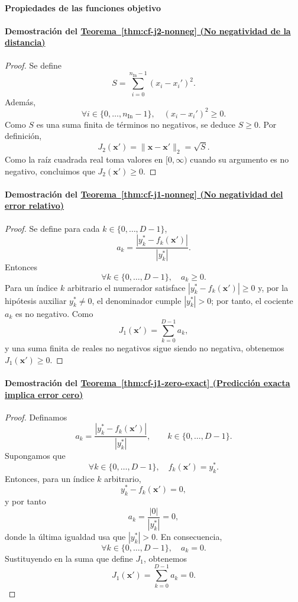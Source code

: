 \documentclass[12pt]{report} %
\begin{document}
\paragraph*{Propiedades de las funciones objetivo}

\paragraph*{Demostración del \hyperref[thm:cf-j2-nonneg]{Teorema~\ref*{thm:cf-j2-nonneg} (No negatividad de la distancia)}}
\begin{proof}
    Se define
    $$S = \sum_{i=0}^{n_{\text{In}}-1}(x_i - x_i')^2.$$
    Además,
    $$\forall i \in \{0, \ldots, n_{\text{In}}-1\},\quad (x_i - x_i')^2 \ge 0.$$
    Como $S$ es una suma finita de términos no negativos, se deduce $S \ge 0$. Por definición,
    $$J_2(\mathbf{x}') = \|\mathbf{x} - \mathbf{x}'\|_2 = \sqrt{S}.$$
    Como la raíz cuadrada real toma valores en $[0, \infty)$ cuando su argumento es no negativo, concluimos que $J_2(\mathbf{x}') \ge 0$.
\end{proof}

\paragraph*{Demostración del \hyperref[thm:cf-j1-nonneg]{Teorema~\ref*{thm:cf-j1-nonneg} (No negatividad del error relativo)}}
\begin{proof}
    Se define para cada $k \in \{0, \ldots, D-1\}$,
    $$a_k = \frac{|y_k^* - f_k(\mathbf{x}')|}{|y_k^*|}.$$
    Entonces
    $$\forall k \in \{0, \ldots, D-1\},\quad a_k \ge 0.$$
    Para un índice $k$ arbitrario el numerador satisface $|y_k^* - f_k(\mathbf{x}')| \ge 0$ y, por la hipótesis auxiliar $y_k^* \neq 0$, el denominador cumple $|y_k^*| > 0$; por tanto, el cociente $a_k$ es no negativo.
    Como
    $$J_1(\mathbf{x}') = \sum_{k=0}^{D-1} a_k,$$
    y una suma finita de reales no negativos sigue siendo no negativa, obtenemos $J_1(\mathbf{x}') \ge 0$.
\end{proof}

\paragraph*{Demostración del \hyperref[thm:cf-j1-zero-exact]{Teorema~\ref*{thm:cf-j1-zero-exact} (Predicción exacta implica error cero)}}
\begin{proof}
    Definamos
    $$a_k = \frac{|y_k^* - f_k(\mathbf{x}')|}{|y_k^*|}, \qquad k \in \{0, \ldots, D-1\}.$$
    Supongamos que
    $$\forall k \in \{0, \ldots, D-1\},\quad f_k(\mathbf{x}') = y_k^*.$$
    Entonces, para un índice $k$ arbitrario,
    $$y_k^* - f_k(\mathbf{x}') = 0,$$
    y por tanto
    $$a_k = \frac{|0|}{|y_k^*|} = 0,$$
    donde la última igualdad usa que $|y_k^*| > 0$. En consecuencia,
    $$\forall k \in \{0, \ldots, D-1\},\quad a_k = 0.$$
    Sustituyendo en la suma que define $J_1$, obtenemos
    $$J_1(\mathbf{x}') = \sum_{k=0}^{D-1} a_k = 0.$$
\end{proof}
\end{document}
